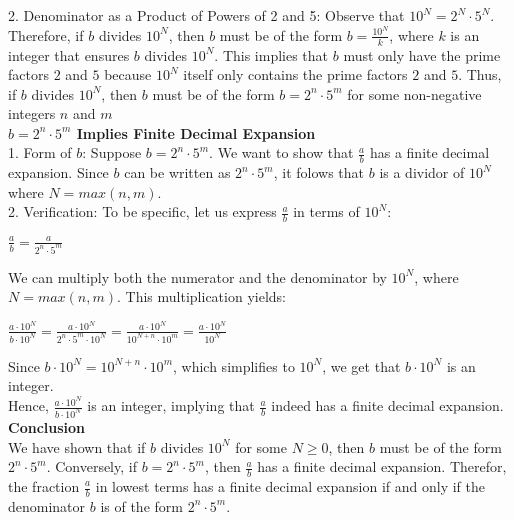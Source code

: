 \documentclass{article}
\begin{document}
2. Denominator as a Product of Powers of 2 and 5: Observe that $10^N = 2^N \cdot 5^N$. Therefore, if $b$ divides $10^N$, then $b$ must be of the form $b = \frac{10^N}{k}$, where $k$ is an integer that ensures $b$ divides $10^N$. This implies that $b$ must only have the prime factors $2$ and $5$ because $10^N$ itself only contains the prime factors $2$ and $5$. Thus, if $b$ divides $10^N$, then $b$ must be of the form $b = 2^n \cdot 5^m$ for some non-negative integers $n$ and $m$\\

\textbf{$b = 2^n \cdot 5^m$ Implies Finite Decimal Expansion}\\

1. Form of $b$: Suppose $b = 2^n \cdot 5^m$. We want to show that $\frac{a}{b}$ has a finite decimal expansion. Since $b$ can be written as $2^n \cdot 5^m$, it folows that $b$ is a dividor of $10^N$ where $N = max(n, m)$.\\

2. Verification: To be specific, let us express $\frac{a}{b}$ in terms of $10^N$:\\

\begin{center}$\frac{a}{b} = \frac{a}{2^n \cdot 5^m}$\\\end{center}

We can multiply both the numerator and the denominator by $10^N$, where $N = max(n, m)$. This multiplication yields:\\

\begin{center} $\frac{a \cdot 10^N}{b \cdot 10^N} = \frac{a \cdot 10^N}{2^n \cdot 5^m \cdot 10^N} = \frac{a \cdot 10^N}{10^{N+n} \cdot 10^m} = \frac{a \cdot 10^N}{10^N}$\\\end{center}

\noindent Since $b \cdot 10^N = 10^{N+n} \cdot 10^m$, which simplifies to $10^N$, we get that $b \cdot 10^N$ is an integer.\\
Hence, $\frac{a \cdot 10^N}{b \cdot 10^N}$ is an integer, implying that $\frac{a}{b}$ indeed has a finite decimal expansion.\\

\textbf{Conclusion}\\

We have shown that if $b$ divides $10^N$ for some $N \geq 0$, then $b$ must be of the form $2^n \cdot 5^m$. Conversely, if $b = 2^n \cdot 5^m$, then $\frac{a}{b}$ has a finite decimal expansion. Therefor, the fraction $\frac{a}{b}$ in lowest terms has a finite decimal expansion if and only if the denominator $b$ is of the form $2^n \cdot 5^m$.
\end{document}

